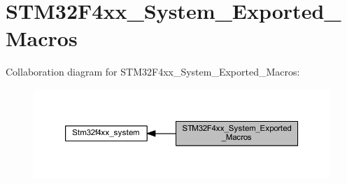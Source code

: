 \hypertarget{group___s_t_m32_f4xx___system___exported___macros}{}\section{S\+T\+M32\+F4xx\+\_\+\+System\+\_\+\+Exported\+\_\+\+Macros}
\label{group___s_t_m32_f4xx___system___exported___macros}
Collaboration diagram for S\+T\+M32\+F4xx\+\_\+\+System\+\_\+\+Exported\+\_\+\+Macros\+:\nopagebreak
\begin{figure}[H]
\begin{center}
\leavevmode
\includegraphics[width=350pt]{group___s_t_m32_f4xx___system___exported___macros}
\end{center}
\end{figure}
